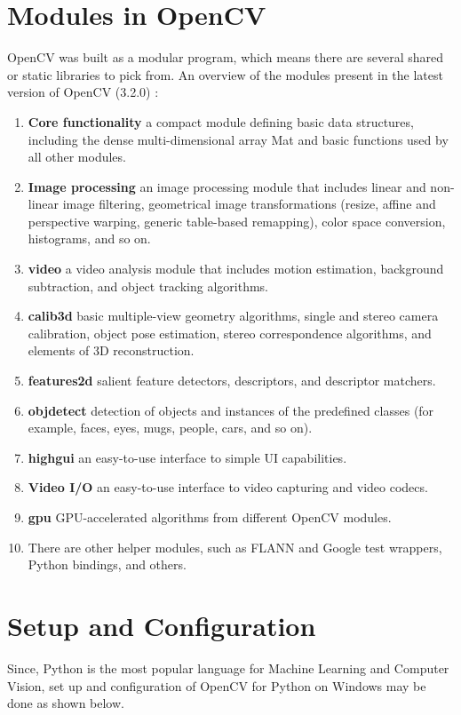 \documentclass[9pt,twocolumn,twoside]{../../styles/osajnl}
\begin{document}
\section{Modules in OpenCV}
OpenCV was built as a modular program, which means there are several shared or static libraries to pick from. An overview of the modules present in the latest version of OpenCV (3.2.0) \cite{www-opencv-intro}:
\begin{enumerate}
    \item \textbf{Core functionality} a compact module defining basic data structures, including the dense multi-dimensional array Mat and basic functions used by all other modules.
    \item \textbf{Image processing} an image processing module that includes linear and non-linear image filtering, geometrical image transformations (resize, affine and perspective warping, generic table-based remapping), color space conversion, histograms, and so on.
    \item \textbf{video} a video analysis module that includes motion estimation, background subtraction, and object tracking algorithms.
    \item \textbf{calib3d} basic multiple-view geometry algorithms, single and stereo camera calibration, object pose estimation, stereo correspondence algorithms, and elements of 3D reconstruction.
    \item \textbf{features2d} salient feature detectors, descriptors, and descriptor matchers.
    \item \textbf{objdetect} detection of objects and instances of the predefined classes (for example, faces, eyes, mugs, people, cars, and so on).
    \item \textbf{highgui} an easy-to-use interface to simple UI capabilities.
    \item \textbf{Video I/O} an easy-to-use interface to video capturing and video codecs.
    \item \textbf{gpu} GPU-accelerated algorithms from different OpenCV modules.
    \item  There are other helper modules, such as FLANN and Google test wrappers, Python bindings, and others.
\end{enumerate}

\section{Setup and Configuration}
Since, Python is the most popular language for Machine Learning and Computer Vision, set up and configuration of OpenCV for Python on Windows may be done as shown below.
\end{document}
